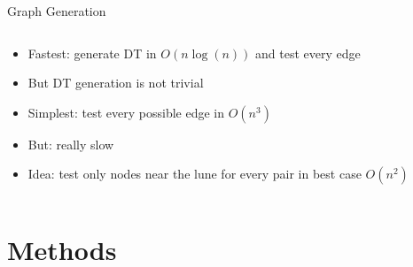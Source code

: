 \documentclass{beamer}
\begin{document}
        \begin{frame}{Graph Generation}
            \begin{columns}[t]
                \begin{column}{5cm}
                    \begin{itemize}
                        \item<1-> Fastest: generate DT in \(O(n \log(n))\) and test every edge
                        \item<2-> But DT generation is not trivial
                        \item<3-> Simplest: test every possible edge in \(O(n^{3})\)
                        \item<4-> But: really slow
                        \item<5-> Idea: test only nodes near the lune for every pair in best case \(O(n^{2})\)
                    \end{itemize}
                \end{column}
                \begin{column}{5cm}
                    \begin{overprint}
                    \end{overprint}
                \end{column}
            \end{columns}
        \end{frame}

\section{Methods}
\end{document}
